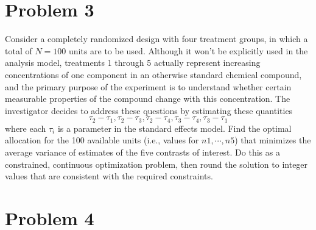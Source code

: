 \documentclass{article}
\begin{document}
\section{Problem 3} Consider a completely randomized design with four treatment groups, in which a total of $N = 100$
units are to be used. Although it won’t be explicitly used in the analysis model, treatments 1 through
5 actually represent increasing concentrations of one component in an otherwise standard chemical
compound, and the primary purpose of the experiment is to understand whether certain measurable
properties of the compound change with this concentration. The investigator decides to address these
questions by estimating these quantities
$$
	\tau_2 -\tau_1, \tau_2-\tau_3, \tau_2-\tau_4,\tau_3 - \tau_4, \tau_3-\tau_1
$$
where each $\tau_i$ is a parameter in the standard effects model. Find the optimal allocation for the 100
available units (i.e., values for $n1,\cdots, n5$) that minimizes the average variance of estimates of the five
contrasts of interest. Do this as a constrained, continuous optimization problem, then round the solution
to integer values that are consistent with the required constraints.

\section{Problem 4}
\end{document}
